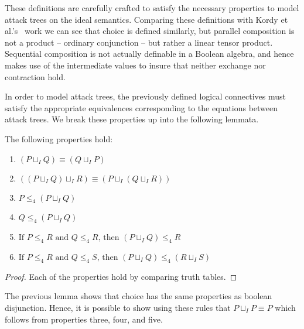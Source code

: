 These definitions are carefully crafted to satisfy the necessary
properties to model attack trees on the ideal semantics.  Comparing
these definitions with Kordy et al.'s~\cite{Kordy:2012} work we can
see that choice is defined similarly, but parallel composition is not
a product -- ordinary conjunction -- but rather a linear tensor
product. Sequential composition is not actually definable in a Boolean
algebra, and hence makes use of the intermediate values to insure that
neither exchange nor contraction hold.

In order to model attack trees, the previously defined logical
connectives must satisfy the appropriate equivalences corresponding to
the equations between attack trees.  We break these properties up into
the following lemmata.

\begin{lemma}
  \label{lemma:basic_properties_for_choice}
  The following properties hold:
  \begin{enumerate}
  \item $(P \sqcup_I Q) \equiv (Q \sqcup_I P)$\\[-5px]
  \item $((P \sqcup_I Q) \sqcup_I R) \equiv (P \sqcup_I (Q \sqcup_I R))$\\[-5px]
  \item $P \leq_4 (P \sqcup_I Q)$\\[-5px]
  \item $Q \leq_4 (P \sqcup_I Q)$\\[-5px]
  \item $\text{If }P \leq_4 R \text{ and } Q \leq_4 R \text{, then } (P \sqcup_I Q) \leq_4 R$\\[-5px]
  \item $\text{If }P \leq_4 R \text{ and } Q \leq_4 S \text{, then } (P \sqcup_I Q) \leq_4 (R \sqcup_I S)$
  \end{enumerate}
\end{lemma}
\begin{proof}
  Each of the properties hold by comparing truth tables.
\end{proof}
The previous lemma shows that choice has the same properties as
boolean disjunction.  Hence, it is possible to show using these rules
that $P \sqcup_I P \equiv P$ which follows from properties three,
four, and five.
